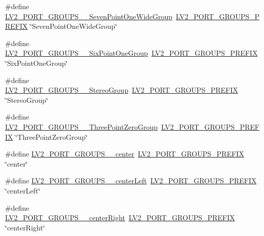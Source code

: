 \begin{DoxyCompactItemize}
\item 
\#define \hyperlink{port-groups_8h_a13e3a7314d20b3c14391d5e767b48358}{L\+V2\+\_\+\+P\+O\+R\+T\+\_\+\+G\+R\+O\+U\+P\+S\+\_\+\+\_\+\+Seven\+Point\+One\+Wide\+Group}~\hyperlink{port-groups_8h_ad8eff71f3c96d9bf45282fed8195fde3}{L\+V2\+\_\+\+P\+O\+R\+T\+\_\+\+G\+R\+O\+U\+P\+S\+\_\+\+P\+R\+E\+F\+IX} \char`\"{}Seven\+Point\+One\+Wide\+Group\char`\"{}
\item 
\#define \hyperlink{port-groups_8h_a164a3251b345d8d7694e551423ab04c1}{L\+V2\+\_\+\+P\+O\+R\+T\+\_\+\+G\+R\+O\+U\+P\+S\+\_\+\+\_\+\+Six\+Point\+One\+Group}~\hyperlink{port-groups_8h_ad8eff71f3c96d9bf45282fed8195fde3}{L\+V2\+\_\+\+P\+O\+R\+T\+\_\+\+G\+R\+O\+U\+P\+S\+\_\+\+P\+R\+E\+F\+IX} \char`\"{}Six\+Point\+One\+Group\char`\"{}
\item 
\#define \hyperlink{port-groups_8h_acc1615a1369cab145421ae7dddb26379}{L\+V2\+\_\+\+P\+O\+R\+T\+\_\+\+G\+R\+O\+U\+P\+S\+\_\+\+\_\+\+Stereo\+Group}~\hyperlink{port-groups_8h_ad8eff71f3c96d9bf45282fed8195fde3}{L\+V2\+\_\+\+P\+O\+R\+T\+\_\+\+G\+R\+O\+U\+P\+S\+\_\+\+P\+R\+E\+F\+IX} \char`\"{}Stereo\+Group\char`\"{}
\item 
\#define \hyperlink{port-groups_8h_a619a026293a07226ccc0d913b54828cc}{L\+V2\+\_\+\+P\+O\+R\+T\+\_\+\+G\+R\+O\+U\+P\+S\+\_\+\+\_\+\+Three\+Point\+Zero\+Group}~\hyperlink{port-groups_8h_ad8eff71f3c96d9bf45282fed8195fde3}{L\+V2\+\_\+\+P\+O\+R\+T\+\_\+\+G\+R\+O\+U\+P\+S\+\_\+\+P\+R\+E\+F\+IX} \char`\"{}Three\+Point\+Zero\+Group\char`\"{}
\item 
\#define \hyperlink{port-groups_8h_a450c05b5a6ddc1d865b01d120e463bb9}{L\+V2\+\_\+\+P\+O\+R\+T\+\_\+\+G\+R\+O\+U\+P\+S\+\_\+\+\_\+center}~\hyperlink{port-groups_8h_ad8eff71f3c96d9bf45282fed8195fde3}{L\+V2\+\_\+\+P\+O\+R\+T\+\_\+\+G\+R\+O\+U\+P\+S\+\_\+\+P\+R\+E\+F\+IX} \char`\"{}center\char`\"{}
\item 
\#define \hyperlink{port-groups_8h_a8c0cc42d288e37fd75e46a6a500d8c1a}{L\+V2\+\_\+\+P\+O\+R\+T\+\_\+\+G\+R\+O\+U\+P\+S\+\_\+\+\_\+center\+Left}~\hyperlink{port-groups_8h_ad8eff71f3c96d9bf45282fed8195fde3}{L\+V2\+\_\+\+P\+O\+R\+T\+\_\+\+G\+R\+O\+U\+P\+S\+\_\+\+P\+R\+E\+F\+IX} \char`\"{}center\+Left\char`\"{}
\item 
\#define \hyperlink{port-groups_8h_a846842519b4f0cd87656b9a64a485faf}{L\+V2\+\_\+\+P\+O\+R\+T\+\_\+\+G\+R\+O\+U\+P\+S\+\_\+\+\_\+center\+Right}~\hyperlink{port-groups_8h_ad8eff71f3c96d9bf45282fed8195fde3}{L\+V2\+\_\+\+P\+O\+R\+T\+\_\+\+G\+R\+O\+U\+P\+S\+\_\+\+P\+R\+E\+F\+IX} \char`\"{}center\+Right\char`\"{}
\item 

\end{DoxyCompactItemize}
